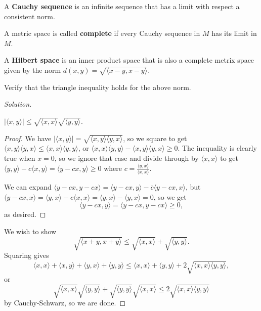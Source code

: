 \begin{df}
A \textbf{Cauchy sequence} is an infinite sequence that has a limit with
respect a consistent norm.
\end{df}

\begin{df}
A metric space is called \textbf{complete} if every Cauchy sequence in
$M$ has its limit in $M$.
\end{df}

\begin{df}
A \textbf{Hilbert space} is an inner product space that is also a
complete metrix space given by the norm $d(x, y) = \sqrt{\langle x - y,
x - y \rangle}$.
\end{df}

\begin{prb}
Verify that the triangle inequality holds for the above norm.
\end{prb}

\begin{proof}[Solution]
\begin{lem}
$|\langle x, y \rangle | \leq \sqrt{\langle x, x \rangle} \sqrt{\langle y,
y \rangle}$.
\end{lem}
\begin{proof}
We have $|\langle x, y \rangle | = \sqrt{\langle x, y \rangle \langle y,
x \rangle}$, so we square to get $\langle x, y \rangle \langle y, x
\rangle \leq \langle x, x \rangle \langle y, y \rangle$, or $\langle x,
x \rangle \langle y, y \rangle - \langle x, y \rangle \langle y, x
\rangle \geq 0$. The inequality is clearly true when $x = 0$, so we
ignore that case and divide through by $\langle x, x \rangle$ to get
$\langle y, y \rangle - c \langle x, y \rangle = \langle y - cx, y
\rangle \geq 0$ where $c = \frac{\langle y, x \rangle}{\langle x, x
\rangle}$.

We can expand $\langle y - cx, y - cx \rangle = \langle y - cx, y
\rangle - \overline{c} \langle y - cx, x \rangle$, but $\langle y - cx,
x \rangle = \langle y, x \rangle - c \langle x, x \rangle = \langle y, x
\rangle - \langle y, x \rangle = 0$, so we get
\[ \langle y - cx, y \rangle = \langle y - cx, y - cx \rangle \geq 0, \]
as desired.

\end{proof}
We wish to show
\[ \sqrt{\langle x + y, x + y \rangle} \leq \sqrt{\langle x, x \rangle}
+ \sqrt{\langle y, y \rangle}. \]
Squaring gives
\[ \langle x, x \rangle + \langle x, y \rangle + \langle y, x \rangle +
\langle y, y \rangle \leq \langle x, x \rangle + \langle y, y \rangle +
2 \sqrt{\langle x, x \rangle \langle y, y \rangle}, \]
or
\[ \sqrt{\langle x, x \rangle} \sqrt{\langle y, y \rangle} +
\sqrt{\langle y, y \rangle} \sqrt{\langle x, x \rangle} \leq 2
\sqrt{\langle x, x \rangle \langle y, y \rangle} \]
by Cauchy-Schwarz, so we are done.
\end{proof}
